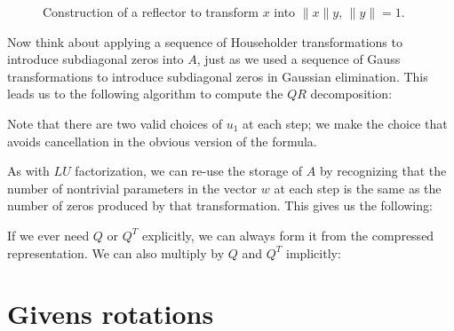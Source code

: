 \documentclass[12pt, leqno]{article} %
\begin{document}
\begin{figure}
\begin{center}
\end{center}
\caption{Construction of a reflector to transform $x$ into $\|x\|y$,
         $\|y\| = 1$.}
\label{fig1}
\end{figure}

Now think about applying a sequence of Householder transformations to
introduce subdiagonal zeros into $A$, just as we used a sequence of Gauss
transformations to introduce subdiagonal zeros in Gaussian elimination.
This leads us to the following algorithm to compute the $QR$
decomposition:

Note that there are two valid choices of $u_1$ at each step;
we make the choice that avoids cancellation in the obvious version
of the formula.

As with $LU$ factorization, we can re-use the storage of $A$ by recognizing
that the number of nontrivial parameters in the vector $w$ at each step
is the same as the number of zeros produced by that transformation.
This gives us the following:


If we ever need $Q$ or $Q^T$ explicitly, we can always form it from
the compressed representation.  We can also multiply by $Q$ and $Q^T$
implicitly:



\section{Givens rotations}
\end{document}
